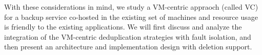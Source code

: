 With these considerations in mind, we study a 
VM-centric appraoch (called VC)
for a backup service co-hosted   in the existing set of machines and resource usage is friendly
to the existing applications.  
We will first discuss and analyze the integration of the VM-centric deduplication strategies with fault isolation, and then present
an architecture and implementation design with deletion support.

%





